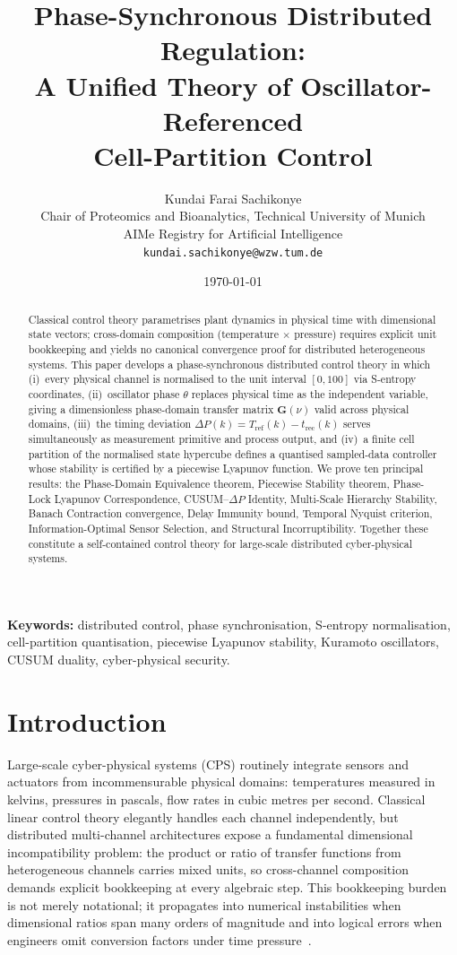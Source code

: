 \documentclass[10pt,twocolumn]{article}
\title{\textbf{Phase-Synchronous Distributed Regulation:\\
       A Unified Theory of Oscillator-Referenced\\
       Cell-Partition Control}}
\author{Kundai Farai Sachikonye\\
\small Chair of Proteomics and Bioanalytics, Technical University of Munich\\
\small AIMe Registry for Artificial Intelligence\\
\small \texttt{kundai.sachikonye@wzw.tum.de}}
\date{\today}
\theoremstyle{plain}
\theoremstyle{definition}
\theoremstyle{remark}
\newcommand{\DeltaP}{\Delta P}
\newcommand{\Tref}{T_{\mathrm{ref}}}
\newcommand{\trec}{t_{\mathrm{rec}}}
\begin{document}
\maketitle

\begin{abstract}
Classical control theory parametrises plant dynamics in physical time
with dimensional state vectors; cross-domain composition
(temperature $\times$ pressure) requires explicit unit bookkeeping and
yields no canonical convergence proof for distributed heterogeneous
systems.  This paper develops a phase-synchronous distributed control
theory in which (i)~every physical channel is normalised to the unit
interval $[0,100]$ via S-entropy coordinates, (ii)~oscillator phase
$\theta$ replaces physical time as the independent variable, giving a
dimensionless phase-domain transfer matrix $\mathbf{G}(\nu)$ valid
across physical domains, (iii)~the timing deviation
$\DeltaP(k) = \Tref(k) - \trec(k)$ serves simultaneously as
measurement primitive and process output, and (iv)~a finite cell
partition of the normalised state hypercube defines a quantised
sampled-data controller whose stability is certified by a piecewise
Lyapunov function.  We prove ten principal results: the
Phase-Domain Equivalence theorem, Piecewise Stability theorem,
Phase-Lock Lyapunov Correspondence, CUSUM--$\DeltaP$ Identity,
Multi-Scale Hierarchy Stability, Banach Contraction convergence,
Delay Immunity bound, Temporal Nyquist criterion,
Information-Optimal Sensor Selection, and Structural
Incorruptibility.  Together these constitute a self-contained
control theory for large-scale distributed cyber-physical systems.
\end{abstract}

\smallskip
\noindent\textbf{Keywords:} distributed control, phase synchronisation,
S-entropy normalisation, cell-partition quantisation, piecewise Lyapunov
stability, Kuramoto oscillators, CUSUM duality, cyber-physical security.

\section{Introduction}
\label{sec:introduction}

Large-scale cyber-physical systems (CPS) routinely integrate sensors and
actuators from incommensurable physical domains: temperatures measured in
kelvins, pressures in pascals, flow rates in cubic metres per second.
Classical linear control theory elegantly handles each channel
independently, but distributed multi-channel architectures expose a
fundamental dimensional incompatibility problem: the product or ratio
of transfer functions from heterogeneous channels carries mixed units,
so cross-channel composition demands explicit bookkeeping at every
algebraic step.  This bookkeeping burden is not merely notational;
it propagates into numerical instabilities when dimensional ratios span
many orders of magnitude and into logical errors when engineers omit
conversion factors under time pressure~\cite{Astrom2008}.
\end{document}
